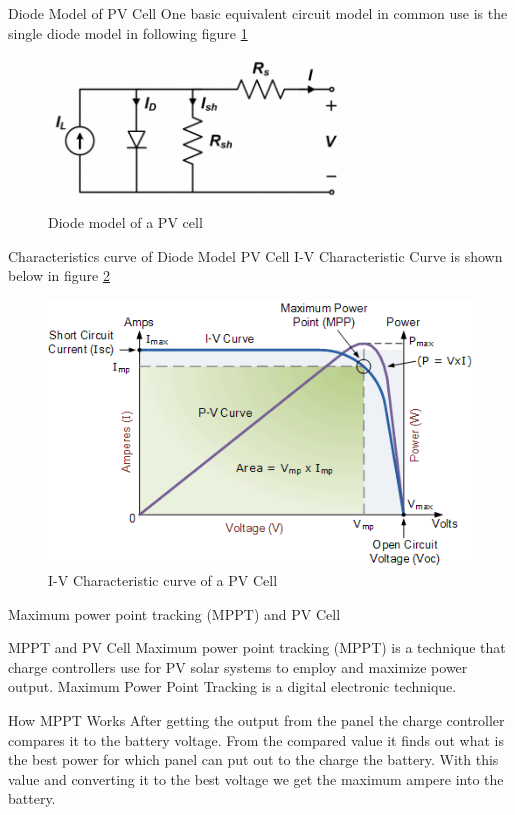 \documentclass[10pt]{beamer}
\begin{document}
\begin{frame}{Diode Model of PV Cell}
One basic equivalent circuit model in common use is the single diode model in following figure \ref{fig:diodemodel}

\begin{figure}
	\centering
    \includegraphics[width=0.6\linewidth,height=4cm]{diodemodel.png}
    \caption{Diode model of a PV cell}
    \label{fig:diodemodel}
\end{figure}

\end{frame}

\begin{frame}{Characteristics curve of Diode Model}
PV Cell I-V Characteristic Curve is shown below in figure \ref{fig:charCurve}
\begin{figure}
	\centering
    \includegraphics[width=0.6\linewidth]{alt120.png}
    \caption{I-V Characteristic curve of a PV Cell}
    \label{fig:charCurve}
\end{figure}
\end{frame}

\begin{frame}{Maximum power point tracking (MPPT) and PV Cell}
\begin{alertblock}{MPPT and PV Cell}
Maximum power point
tracking (MPPT) is a technique that charge controllers use for
PV solar systems to employ and maximize power output.
Maximum Power Point Tracking is a digital electronic
technique.
\end{alertblock}

\begin{exampleblock}{How MPPT Works}
After getting the output from the panel the charge
controller compares it to the battery voltage. From the
compared value it finds out what is the best power for which
panel can put out to the charge the battery. With this value and
converting it to the best voltage we get the maximum ampere
into the battery.
\end{exampleblock}

\end{frame}
\end{document}
